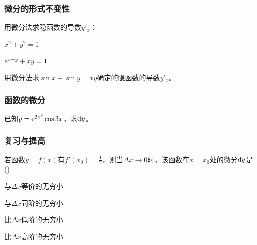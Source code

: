 \documentclass[14pt,notheorems,leqno,xcolor={rgb}]{beamer} %
\begin{document}
\begin{frame}
\frametitle{微分的形式不变性}
\begin{example}
用微分法求隐函数的导数$y'_x$：\\
\begin{enumhalf}
  \item $x^2+y^2=1$ ~
  \item $\mathrm{e}^{x+y}+xy=1$ ~
\end{enumhalf}
\end{example}
\vpause
\begin{exercise}
用微分法求$\sin x +\sin y = xy$确定的隐函数的导数$y'_x$。
\end{exercise}
\end{frame}

\begin{oframe}
\frametitle{函数的微分}
\begin{review}
已知$y=\mathrm{e}^{2x^2}\cos 3x$，求$\mathop{}\!\mathrm{d} y$。
\end{review}
\end{oframe}


\begin{iframe}
\frametitle{复习与提高}
\begin{choice}
若函数$y=f(x)$有$f'(x_0)=\frac12$，则当$\Delta x\to0$时，该函数在$x=x_0$处的微分$\mathop{}\!\mathrm{d} y$是\dotfill()
\begin{choicehalf}
  \item 与$\Delta x$等价的无穷小 ~
  \item 与$\Delta x$同阶的无穷小 ~
  \item 比$\Delta x$低阶的无穷小 ~
  \item 比$\Delta x$高阶的无穷小 ~
\end{choicehalf}
\end{choice}
\end{iframe}
\end{document}
